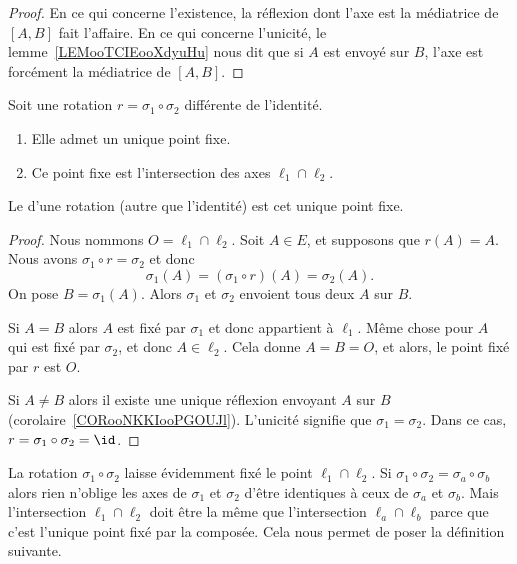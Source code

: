 \begin{proof}
	En ce qui concerne l'existence, la réflexion dont l'axe est la médiatrice de \( [A,B]\) fait l'affaire. En ce qui concerne l'unicité, le lemme~\ref{LEMooTCIEooXdyuHu} nous dit que si \( A\) est envoyé sur \( B\), l'axe est forcément la médiatrice de \( [A,B]\).
\end{proof}

\begin{lemmaDef}        \label{LEMooIJELooLWqBfE}
	Soit une rotation \( r=\sigma_1\circ\sigma_2\) différente de l'identité.
	\begin{enumerate}
		\item
		      Elle admet un unique point fixe.
		\item
		      Ce point fixe est l'intersection des axes \( \ell_1\cap\ell_2\).
	\end{enumerate}

	Le  d'une rotation (autre que l'identité) est cet unique point fixe.
\end{lemmaDef}

\begin{proof}
	Nous nommons \( O=\ell_1\cap\ell_2\). Soit \( A\in E\), et supposons que \( r(A)=A\). Nous avons \( \sigma_1\circ r=\sigma_2\) et donc
	\begin{equation}
		\sigma_1(A)=(\sigma_1\circ r)(A)=\sigma_2(A).
	\end{equation}
	On pose \( B=\sigma_1(A)\). Alors \( \sigma_1\) et \( \sigma_2\) envoient tous deux \( A\) sur \( B\).

	Si \( A=B\) alors \( A\) est fixé par \( \sigma_1\) et donc appartient à \( \ell_1\). Même chose pour \( A\) qui est fixé par \( \sigma_2\), et donc \( A\in\ell_2\). Cela donne \( A=B=O\), et alors, le point fixé par \( r\) est \( O\).

	Si \( A\neq B\) alors il existe une unique réflexion envoyant \( A\) sur \( B\) (corolaire~\ref{CORooNKKIooPGOUJl}). L'unicité signifie que \( \sigma_1=\sigma_2\). Dans ce cas, \( r=\sigma_1\circ\sigma_2=\id\).
\end{proof}

\begin{normaltext}      \label{NORMooDPBOooKkRuTn}
	La rotation \( \sigma_1\circ\sigma_2\) laisse évidemment fixé le point \( \ell_1\cap \ell_2\). Si \( \sigma_1\circ\sigma_2=\sigma_a\circ\sigma_b\) alors rien n'oblige les axes de \( \sigma_1\) et \( \sigma_2\) d'être identiques à ceux de \( \sigma_a\) et \( \sigma_b\). Mais l'intersection \( \ell_1\cap\ell_2\) doit être la même que l'intersection \( \ell_a\cap \ell_b\) parce que c'est l'unique point fixé par la composée. Cela nous permet de poser la définition suivante.
\end{normaltext}

